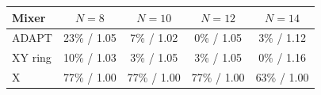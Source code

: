 \begin{tabular}{lcccc}
\toprule
Mixer & $N=8$ & $N=10$ & $N=12$ & $N=14$ \\
\midrule
ADAPT & 23\% / 1.05 & 7\% / 1.02 & 0\% / 1.05 & 3\% / 1.12 \\
XY ring & 10\% / 1.03 & 3\% / 1.05 & 3\% / 1.05 & 0\% / 1.16 \\
X & 77\% / 1.00 & 77\% / 1.00 & 77\% / 1.00 & 63\% / 1.00 \\
\bottomrule
\end{tabular}
